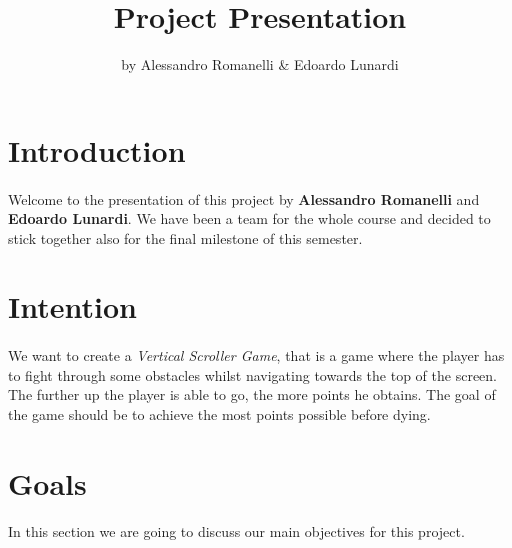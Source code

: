 \documentclass[a4paper]{article}
\title{\Huge Project Presentation}
\date{}
\author{by Alessandro Romanelli \& Edoardo Lunardi}
\begin{document}
\maketitle
\begin{figure}[b]
\end{figure}
\newpage
\tableofcontents %
\newpage

\section{Introduction}
\paragraph{} Welcome to the presentation of this project by \textbf{Alessandro Romanelli} and
\textbf{Edoardo Lunardi}. We have been a team for the whole course and decided to stick together
also for the final milestone of this semester. \par

\section{Intention}
\paragraph{} We want to create a \emph{Vertical Scroller Game}, that is a game where the player has to fight through some obstacles whilst navigating towards the top of the screen. The further up the player is able to go, the more points he obtains. The goal of the game should be to achieve the most points possible before dying.

\section{Goals}
In this section we are going to discuss our main objectives for this project.
\end{document}
